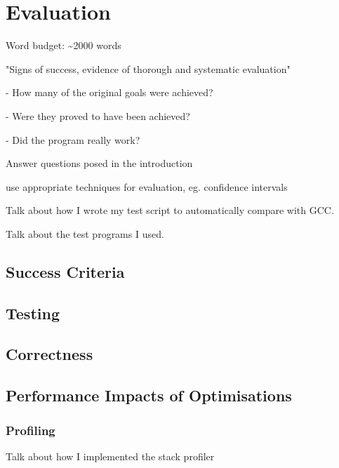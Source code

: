 \documentclass[00-main.tex]{subfiles}
\begin{document}
\chapter{Evaluation}

\begin{Comment}
Word budget: \textasciitilde 2000 words
\end{Comment}

\begin{Comment}
"Signs of success, evidence of thorough and systematic evaluation"

- How many of the original goals were achieved?

- Were they proved to have been achieved?

- Did the program really work?

Answer questions posed in the introduction

use appropriate techniques for evaluation, eg. confidence intervals
\end{Comment}

\begin{Comment}
Talk about how I wrote my test script to automatically compare with GCC.

Talk about the test programs I used.
\end{Comment}


\section{Success Criteria}

\section{Testing}

\section{Correctness}

\section{Performance Impacts of Optimisations}

\subsection{Profiling}

\begin{Comment}
Talk about how I implemented the stack profiler
\end{Comment}
\end{document}
